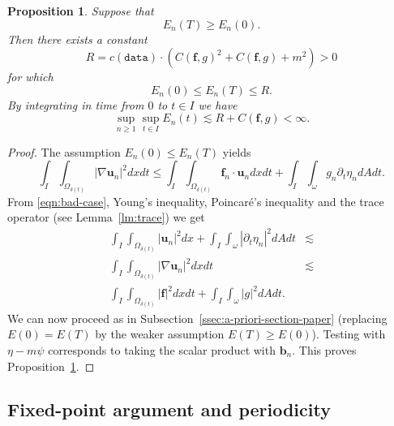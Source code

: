 \documentclass[10pt,a4paper]{article}
\newtheorem{proposition}[theorem]{Proposition}
\numberwithin{equation}{section}
\begin{document}
\begin{proposition}\label{prop: invariant-ball} 
Suppose that \[E_{n} (T) \ge E_{n} (0).\]
Then
there exists a constant    
\begin{equation}\label{eqn:R-chap02}
R=c\left(\texttt{data}\right)\cdot\left(C\left(\mathbf{f},g\right)^{2}+C\left(\mathbf{f},g\right)+m^{2}\right)>0
\end{equation}
for which
 \[E_{n} \left(0 \right) \le E_{n} \left(T \right) \le R.\]
By integrating in time from $0$ to $t\in I$ we have
\begin{equation}\label{eqn:chap02-bound-E-n}
\sup_{n\ge1}\sup_{t\in I}E_{n}\left(t\right)\lesssim R+C(\mathbf{f},g)<\infty.
\end{equation}

\end{proposition}
\begin{proof}
The assumption $ E_{n} (0) \le E_{n} (T) $  yields 
\begin{equation}\label{eqn:bad-case}
\int_{I}\int_{\Omega_{\delta\left(t\right)}}\left|\nabla\mathbf{u}_{n}\right|^{2}dxdt\le\int_{I}\int_{\Omega_{\delta\left(t\right)}}\mathbf{f}_{n}\cdot\mathbf{u}_{n}dxdt+\int_{I}\int_{\omega}g_{n}\partial_{t}\eta_{n}dAdt.
\end{equation}
From  \eqref{eqn:bad-case}, Young's inequality,  Poincar\'{e}'s inequality and the trace operator (see Lemma~\ref{lm:trace}) we get
\begin{equation}\label{eqn:consequence-claim}
\begin{aligned}\int_{I}\int_{\Omega_{\delta\left(t\right)}}\left|\mathbf{u}_{n}\right|^{2}dx+\int_{I}\int_{\omega}\left|\partial_{t}\eta_{n}\right|^{2}dAdt & \lesssim\\
\int_{I}\int_{\Omega_{\delta\left(t\right)}}\left|\nabla\mathbf{u}_{n}\right|^{2}dxdt & \lesssim\\
\int_{I}\int_{\Omega_{\delta\left(t\right)}}\left|\mathbf{f}\right|^{2}dxdt+\int_{I}\int_{\omega}\left|g\right|^{2}dAdt.
\end{aligned}
\end{equation}
We can now proceed as in Subsection~\ref{ssec:a-priori-section-paper} (replacing $E(0)=E(T)$ by the weaker assumption $E(T)\ge E(0)$). Testing with $\eta-m\psi$ corresponds to taking the scalar product with $\mathbf{b}_{n}$.
This proves  Proposition~\ref{prop: invariant-ball}.
\end{proof}

\subsection{Fixed-point argument and periodicity}
\end{document}
